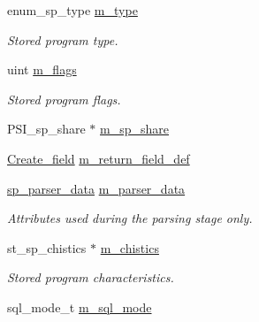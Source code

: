 \begin{DoxyCompactItemize}
\item 
\mbox{\label{classsp__head_ad83c5aad553b4463038e3c429821a78e}} 
enum\+\_\+sp\+\_\+type \mbox{\hyperlink{classsp__head_ad83c5aad553b4463038e3c429821a78e}{m\+\_\+type}}
\begin{DoxyCompactList}\small\item\em Stored program type. \end{DoxyCompactList}\item 
\mbox{\label{classsp__head_a52ea2e94c7500a299654665e7b9a0cc8}} 
uint \mbox{\hyperlink{classsp__head_a52ea2e94c7500a299654665e7b9a0cc8}{m\+\_\+flags}}
\begin{DoxyCompactList}\small\item\em Stored program flags. \end{DoxyCompactList}\item 
P\+S\+I\+\_\+sp\+\_\+share $\ast$ \mbox{\hyperlink{classsp__head_abe1fa0b6ce7890d3f84c731be10c3863}{m\+\_\+sp\+\_\+share}}
\item 
\mbox{\hyperlink{classCreate__field}{Create\+\_\+field}} \mbox{\hyperlink{classsp__head_a44ffe5b534816fc045d51ed4eb3af785}{m\+\_\+return\+\_\+field\+\_\+def}}
\item 
\mbox{\label{classsp__head_ac488567354fff13b29eaa9cd5b26144f}} 
\mbox{\hyperlink{classsp__parser__data}{sp\+\_\+parser\+\_\+data}} \mbox{\hyperlink{classsp__head_ac488567354fff13b29eaa9cd5b26144f}{m\+\_\+parser\+\_\+data}}
\begin{DoxyCompactList}\small\item\em Attributes used during the parsing stage only. \end{DoxyCompactList}\item 
\mbox{\label{classsp__head_a1c2de0f4a011e5b7038a9da4bf172c47}} 
st\+\_\+sp\+\_\+chistics $\ast$ \mbox{\hyperlink{classsp__head_a1c2de0f4a011e5b7038a9da4bf172c47}{m\+\_\+chistics}}
\begin{DoxyCompactList}\small\item\em Stored program characteristics. \end{DoxyCompactList}\item 
sql\+\_\+mode\+\_\+t \mbox{\hyperlink{classsp__head_a9deb9606abdbc7358ed6f5917126058d}{m\+\_\+sql\+\_\+mode}}
\item 

\end{DoxyCompactItemize}
